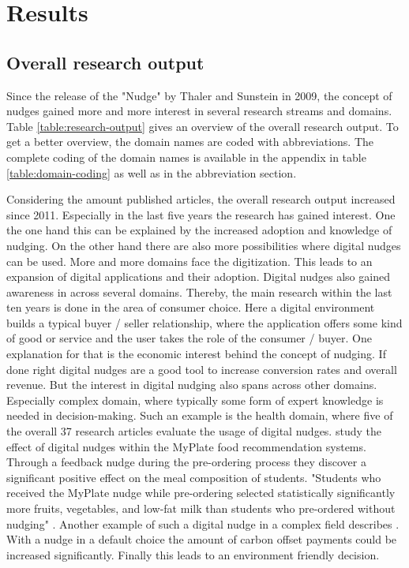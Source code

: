 \section{Results}

\subsection{Overall research output}
Since the release of the "Nudge" by Thaler and Sunstein in 2009, the concept of nudges gained more and more interest in several research streams and domains. Table \ref{table:research-output} gives an overview of the overall research output. To get a better overview, the domain names are coded with abbreviations. The complete coding of the domain names is available in the appendix in table \ref{table:domain-coding} as well as in the abbreviation section.

Considering the amount published articles, the overall research output increased since 2011. Especially in the last five years the research has gained interest. One the one hand this can be explained by the increased adoption and knowledge of nudging. On the other hand there are also more possibilities where digital nudges can be used. More and more domains face the digitization. This leads to an expansion of digital applications and their adoption. %
Digital nudges also gained awareness in across several domains. Thereby, the main research within the last ten years is done in the area of consumer choice. Here a digital environment builds a typical buyer / seller relationship, where the application offers some kind of good or service and the user takes the role of the consumer / buyer. One explanation for that is the economic interest behind the concept of nudging. If done right digital nudges are a good tool to increase conversion rates and overall revenue. %
But the interest in digital nudging also spans across other domains. Especially complex domain, where typically some form of expert knowledge is needed in decision-making. Such an example is the health domain, where five of the overall 37 research articles evaluate the usage of digital nudges. \cite{miller_effects_2016} study the effect of digital nudges within the MyPlate food recommendation systems. Through a feedback nudge during the pre-ordering process they discover a significant positive effect on the meal composition of students. "Students who received the MyPlate nudge while pre-ordering selected statistically significantly more fruits, vegetables, and low-fat milk than students who pre-ordered without nudging" \cite{miller_effects_2016}.
Another example of such a digital nudge in a complex field describes \cite{szekely_nudging_2016}. With a nudge in a default choice the amount of carbon offset payments could be increased significantly. Finally this leads to an environment friendly decision.


